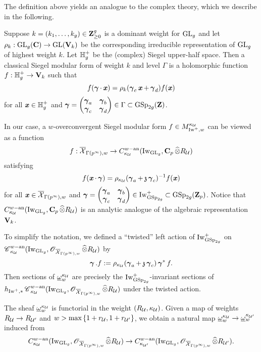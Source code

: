 \begin{Remark}\label{Remark: analogy to the complex version}
\normalfont The definition above yields an analogue to the complex theory, which we describe in the following.

Suppose $k=(k_1, \ldots, k_g)\in \Z_{\geq 0}^g$ is a dominant weight for $\GL_g$ and let $\rho_k:\GL_g(\C)\rightarrow \GL(\V_k)$ be the corresponding irreducible representation of $\GL_g$ of highest weight $k$. Let $\bbH_g^+$ be the (complex) Siegel upper-half space. Then a classical Siegel modular form of weight $k$ and level $\Gamma$ is a holomorphic function $f:\bbH_g^+\rightarrow \V_k$ such that
$$f(\bfgamma\cdot \bfitx)=\rho_k(\bfgamma_c\bfitx+\bfgamma_d)f(\bfitx)$$
for all $\bfitx\in \bbH_g^+$ and $\bfgamma=\begin{pmatrix}\bfgamma_a & \bfgamma_b\\ \bfgamma_c & \bfgamma_d\end{pmatrix}\in \Gamma\subset \GSp_{2g}(\Z)$.

In our case, a $w$-overconvergent Siegel modular form $f\in M_{\Iw^+, w }^{\kappa_{\calU}}$ can be viewed as a function 
$$f: \overline{\calX}_{\Gamma(p^{\infty}), w}\rightarrow C^{w-\an}_{\kappa_{\calU}}(\Iw_{\GL_g}, \C_p\widehat{\otimes}R_{\calU})$$ 
satisfying $$f(\bfitx\cdot \bfgamma)=\rho_{\kappa_{\calU}}(\bfgamma_a + \frakz\bfgamma_c)^{-1}f(\bfitx)$$
for all $\bfitx\in \overline{\calX}_{\Gamma(p^{\infty}), w}$ and $\bfgamma=\begin{pmatrix}\bfgamma_a & \bfgamma_b\\ \bfgamma_c & \bfgamma_d\end{pmatrix}\in \Iw_{\GSp_{2g}}^+\subset \GSp_{2g}(\Z_p)$. Notice that $C^{w-\an}_{\kappa_{\calU}}(\Iw_{\GL_g}, \C_p\widehat{\otimes}R_{\calU})$ is an analytic analogue of the algebraic representation $\V_k$.
\end{Remark}

To simplify the notation, we defined a ``twisted'' left action of $\Iw^+_{\GSp_{2g}}$ on $\scrC^{w-\an}_{\kappa_{\calU}}(\Iw_{\GL_g}, \scrO_{\overline{\calX}_{\Gamma(p^{\infty}),w}}\widehat{\otimes}R_{\calU})$ by
$$\bfgamma. f:= \rho_{\kappa_{\calU}}(\bfgamma_a+\frakz \bfgamma_c)\bfgamma^*f.$$
Then sections of $\underline{\omega}^{\kappa_{\calU}}_w$ are precisely the $\Iw^+_{\GSp_{2g}}$-invariant sections of $h_{\Iw^+, *}\scrC^{w-\an}_{\kappa_{\calU}}(\Iw_{\GL_g}, \scrO_{\overline{\calX}_{\Gamma(p^{\infty}),w}}\widehat{\otimes}R_{\calU})$ under the twisted action.

\begin{Remark}
\normalfont The sheaf $\underline{\omega}_w^{\kappa_{\calU}}$ is functorial in the weight $(R_{\calU}, \kappa_{\calU})$. Given a map of weights $R_{\calU} \rightarrow R_{\calU'}$ and $w > \mbox{max}\left\{1+r_{\calU}, 1+r_{\calU'}\right\}$, we obtain a natural map $\underline{\omega}_w^{\kappa_{\calU}} \rightarrow \underline{\omega}_w^{\kappa_{\calU'}}$ induced from
\[C^{w-\an}_{\kappa_{\calU}}(\Iw_{\GL_g}, \scrO_{\overline{\calX}_{\Gamma(p^{\infty}), w}}\widehat{\otimes}R_{\calU}) \rightarrow C^{w-\an}_{\kappa_{\calU'}}(\Iw_{\GL_g}, \scrO_{\overline{\calX}_{\Gamma(p^{\infty}), w}}\widehat{\otimes}R_{\calU'}).\]  
\end{Remark}


